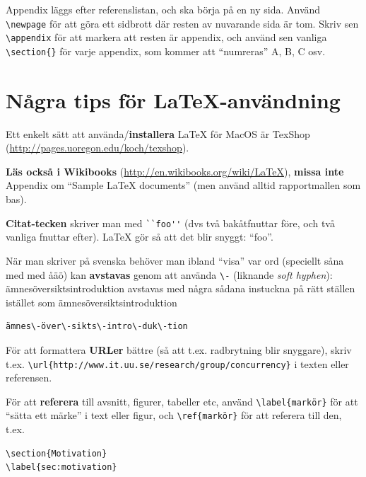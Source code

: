 \documentclass[swedish, a4paper,12pt]{article}
\begin{document}
Appendix läggs efter referenslistan, och ska börja på en ny sida. Använd \verb|\newpage| för att göra ett sidbrott där resten av nuvarande sida är tom. Skriv sen \verb|\appendix| för att markera att resten är appendix, och
 använd sen vanliga \verb|\section{}| för varje appendix, som kommer att ``numreras'' A, B, C osv.

\section{Några tips för La\TeX-användning}

Ett enkelt sätt att använda/\textbf{installera} LaTeX för MacOS är TexShop (\url{http://pages.uoregon.edu/koch/texshop}).

\textbf{Läs också i Wikibooks} (\url{http://en.wikibooks.org/wiki/LaTeX}), \textbf{missa inte} Appendix om ``Sample LaTeX documents'' (men använd alltid rapportmallen som bas).

\textbf{Citat-tecken} skriver man med \verb|``foo''| (dvs två bakåtfnuttar före, och två vanliga fnuttar efter). LaTeX gör så att det blir snyggt: ``foo''.

När man skriver på svenska behöver man ibland ``visa'' var ord (speciellt såna med med åäö) kan \textbf{avstavas} genom att använda \verb|\-| (liknande \textit{soft hyphen}): ämnesöversiktsintroduktion avstavas med några sådana instuckna på rätt ställen istället som ämnes\-över\-sikts\-intro\-duk\-tion

\begin{verbatim}
ämnes\-över\-sikts\-intro\-duk\-tion
\end{verbatim}

För att formattera \textbf{URLer} bättre (så att t.ex. radbrytning blir snyggare), skriv t.ex. \verb|\url{http://www.it.uu.se/research/group/concurrency}| i texten eller referensen.

För att \textbf{referera} till avsnitt, figurer, tabeller etc, använd \verb|\label{markör}| för att ``sätta ett märke'' i text eller figur, och \verb|\ref{markör}| för att referera till den, t.ex.
\begin{verbatim}
\section{Motivation}
\label{sec:motivation}
\end{verbatim}
\end{document}

